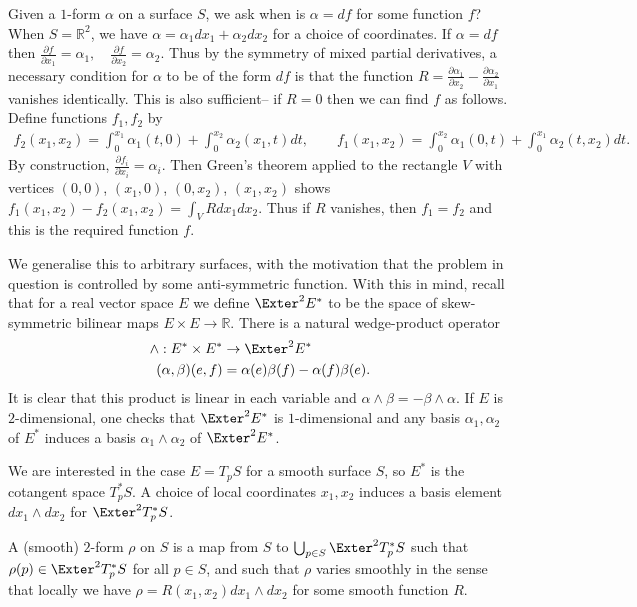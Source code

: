 Given a \(1\)-form \(\alpha\) on a surface \(S\), we
ask when is \(\alpha=df\) for some function \(f\)? When \(S=\mathbb{R}^2\), we
have \(\alpha=\alpha_1dx_1 +\alpha_2dx_2\) for a choice of coordinates. If
\(\alpha=df\) then
\(
    \frac{\partial f}{\partial x_1}
    = \alpha_1, \quad  \frac{\partial f}{\partial x_2} = \alpha_2.
\)
Thus by the symmetry of mixed partial derivatives, a necessary
condition for \(\alpha\) to be of the form \(df\) is that the
function \(R=\frac{\partial \alpha_1}{\partial x_2} - \frac{\partial
\alpha_2}{\partial x_1}\) vanishes identically. This is also sufficient-- if \(R=0\) then we can find \(f\) as follows.
Define functions \(f_1,f_2\) by
\begin{align*}
    f_2(x_1,x_2)=\int_0^{x_1}\alpha_1(t,0)+\int_0^{x_2}\alpha_2(x_1,t)dt,\qquad
    f_1(x_1,x_2)=\int_0^{x_2}\alpha_1(0,t)+\int_0^{x_1}\alpha_2(t,x_2)dt.
\end{align*}
By construction, \(\frac{\partial f_i}{\partial x_i}=\alpha_i\). Then Green's
theorem applied to the rectangle \(V\) with vertices \((0,0)\), \((x_1,0)\),
\((0,x_2)\), \((x_1,x_2)\) shows \(f_1(x_1,x_2)-f_2(x_1,x_2)=\int_V
Rdx_1dx_2\). Thus if \(R\) vanishes, then \(f_1=f_2\) and this is the required
function \(f\).

We generalise this to arbitrary surfaces, with the motivation that the problem
in question is controlled by some anti-symmetric function. With this in mind,
recall that for a real vector space \(E\) we define \(\Exter^2E^\ast\) to be the
space of skew-symmetric bilinear maps \(E\times E\to \mathbb{R}\). There is a
natural wedge-product operator
\begin{align*}
    \wedge:E^\ast \times E^\ast &\to \Exter^2 E^\ast \\
    (\alpha, \beta)(e,f) &= \alpha(e)\beta(f)-\alpha(f)\beta(e).
\end{align*}
It is clear that this product is linear in each variable and \(\alpha\wedge
\beta = -\beta\wedge \alpha\). If \(E\) is \(2\)-dimensional, one checks that
\(\Exter^2E^\ast\) is \(1\)-dimensional and any basis \(\alpha_1,\alpha_2\) of
\(E^\ast\) induces a basis \(\alpha_1\wedge \alpha_2\) of \(\Exter^2E^\ast\).

We are interested in the case \(E=T_pS\) for a smooth surface \(S\), so
\(E^\ast\) is the cotangent space \(T_p^\ast S\). A choice of local
coordinates \(x_1,x_2\) induces a basis element \(dx_1\wedge dx_2\) for
\(\Exter^2T_p^\ast S\).

\begin{definition}
    A (smooth) \(2\)-form \(\rho\) on \(S\) is a map from \(S\) to
    \(\bigcup_{p\in S}\Exter^2T_p^\ast S\) such that \(\rho(p)\in
    \Exter^2T_p^\ast S\) for all \(p\in S\), and such that \(\rho\) varies
    smoothly in the sense that locally we have \(\rho=R(x_1,x_2)dx_1\wedge
    dx_2\) for some smooth function \(R\).
\end{definition}

